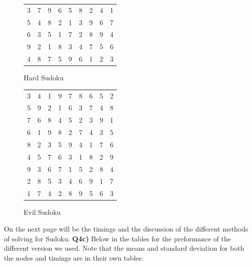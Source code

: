 \documentclass{article}
\begin{document}
\begin{titlepage}
\begin{figure}[H]
\begin{minipage}[c]{0.45\linewidth}
\begin{tabular}{ |ccc|ccc|ccc| }
 3 & 7 & 9 & 6 & 5 & 8 & 2 & 4 & 1 \\
 5 & 4 & 8 & 2 & 1 & 3 & 9 & 6 & 7 \\
\hline
 6 & 3 & 5 & 1 & 7 & 2 & 8 & 9 & 4 \\
 9 & 2 & 1 & 8 & 3 & 4 & 7 & 5 & 6 \\
 4 & 8 & 7 & 5 & 9 & 6 & 1 & 2 & 3 \\
\hline
\end{tabular}
\caption{Hard Sudoku}
\end{minipage}
\hfill
\begin{minipage}[c]{0.45\linewidth}
\centering
\begin{tabular}{ |ccc|ccc|ccc| } 
\hline
 3 & 4 & 1 & 9 & 7 & 8 & 6 & 5 & 2 \\
 5 & 9 & 2 & 1 & 6 & 3 & 7 & 4 & 8 \\
 7 & 6 & 8 & 4 & 5 & 2 & 3 & 9 & 1 \\
\hline
 6 & 1 & 9 & 8 & 2 & 7 & 4 & 3 & 5 \\
 8 & 2 & 3 & 5 & 9 & 4 & 1 & 7 & 6 \\
 4 & 5 & 7 & 6 & 3 & 1 & 8 & 2 & 9 \\
\hline
 9 & 3 & 6 & 7 & 1 & 5 & 2 & 8 & 4 \\
 2 & 8 & 5 & 3 & 4 & 6 & 9 & 1 & 7 \\
 1 & 7 & 4 & 2 & 8 & 9 & 5 & 6 & 3 \\
\hline
\end{tabular}
\caption{Evil Sudoku}
\end{minipage}%
\end{figure} 
On the next page will be the timings and the discussion of the different methods of solving for Sudoku.
\newpage
\textbf{Q4c)} Below in the tables for the preformance of the different version we used. Note that the means and standard deviation for both the nodes and timings are in their own tables:



\end{titlepage}
\end{document}
